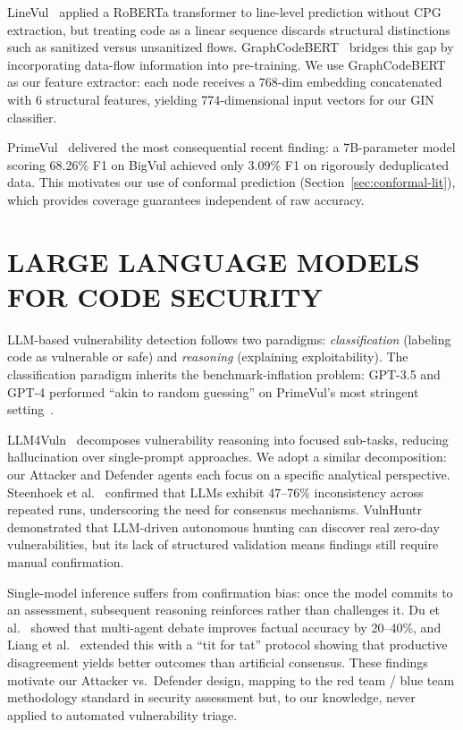 LineVul~\cite{linevul2022} applied a RoBERTa transformer to line-level
prediction without CPG extraction, but treating code as a linear
sequence discards structural distinctions such as sanitized versus
unsanitized flows. GraphCodeBERT~\cite{graphcodebert2021} bridges this
gap by incorporating data-flow information into pre-training. We use
GraphCodeBERT as our feature extractor: each node receives a 768-dim
embedding concatenated with 6 structural features, yielding
774-dimensional input vectors for our GIN classifier.

PrimeVul~\cite{primevul2024} delivered the most consequential recent
finding: a 7B-parameter model scoring 68.26\% F1 on BigVul achieved
only 3.09\% F1 on rigorously deduplicated data. This motivates our use
of conformal prediction (Section~\ref{sec:conformal-lit}), which provides
coverage guarantees independent of raw accuracy.

\section{\uppercase{Large Language Models for Code Security}}
\label{sec:llm-lit}

LLM-based vulnerability detection follows two paradigms:
\emph{classification} (labeling code as vulnerable or safe) and
\emph{reasoning} (explaining exploitability). The classification paradigm
inherits the benchmark-inflation problem: GPT-3.5 and GPT-4 performed
``akin to random guessing'' on PrimeVul's most stringent
setting~\cite{primevul2024}.

LLM4Vuln~\cite{llm4vuln2024} decomposes vulnerability reasoning into
focused sub-tasks, reducing hallucination over single-prompt approaches.
We adopt a similar decomposition: our Attacker and Defender agents each
focus on a specific analytical perspective.
Steenhoek et al.~\cite{steenhoek2024} confirmed that LLMs exhibit
47--76\% inconsistency across repeated runs, underscoring the need for
consensus mechanisms. VulnHuntr~\cite{vulnhuntr2024} demonstrated that
LLM-driven autonomous hunting can discover real zero-day
vulnerabilities, but its lack of structured validation means findings
still require manual confirmation.

Single-model inference suffers from confirmation bias: once the model
commits to an assessment, subsequent reasoning reinforces rather than
challenges it. Du et al.~\cite{multiagentdebate2023} showed that
multi-agent debate improves factual accuracy by 20--40\%, and
Liang et al.~\cite{divergentthinking2023} extended this with a
``tit for tat'' protocol showing that productive disagreement yields
better outcomes than artificial consensus. These findings motivate our
Attacker vs.\ Defender design, mapping to the red team / blue team
methodology standard in security assessment but, to our knowledge, never
applied to automated vulnerability triage.

